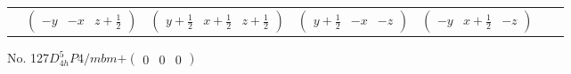 \documentclass[fleqn,9pt,landscape]{jsarticle}
\begin{document}
\begin{center}
\begin{longtable}{ccccccc}
& $ \begin{pmatrix} - y & - x & z + \frac{1}{2} \end{pmatrix} $ & $ \begin{pmatrix} y + \frac{1}{2} & x + \frac{1}{2} & z + \frac{1}{2} \end{pmatrix} $ & $ \begin{pmatrix} y + \frac{1}{2} & - x & - z \end{pmatrix} $ & $ \begin{pmatrix} - y & x + \frac{1}{2} & - z \end{pmatrix} $ & $  $ & $  $ \\
\end{longtable}
\end{center}
\newpage
No. 127\quad$D_{4h}^{5}$\quad$P4/mbm$\quad[ tetragonal ]\quad$+\begin{pmatrix} 0 & 0 & 0 \end{pmatrix}$
\end{document}
